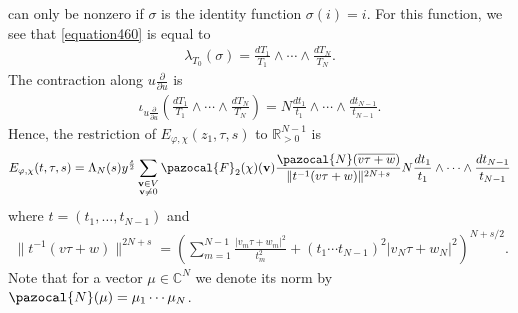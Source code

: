 \documentclass[a4paper,11pt]{amsart} %
\newcommand{\8}{\infty}
\newcommand{\vbf}{\mathbf{v}}
\newcommand{\four}{\pazocal{F}}
\newcommand{\R}{\mathbb{R}}
\newcommand{\C}{\mathbb{C}}
\newcommand{\N}{\pazocal{N}}
\theoremstyle{mytheoremstyle}
\theoremstyle{remark}
\numberwithin{equation}{section}
\begin{document}
can only be nonzero if $\sigma$ is the identity function $\sigma(i)=i$. For this function, we see that \eqref{equation460} is equal to
\begin{align}
\lambda_{T_0}(\sigma)=\frac{dT_1}{T_1} \wedge \cdots \wedge \frac{dT_N}{T_N}.
\end{align}
The contraction along $u \frac{\partial}{\partial u}$ is 
\begin{align}
\iota_{u \frac{\partial}{\partial u}} \left (\frac{dT_1}{T_1} \wedge \cdots \wedge \frac{dT_N}{T_N} \right )=N \frac{dt_1}{t_1} \wedge \cdots \wedge \frac{dt_{N-1}}{t_{N-1}}.
\end{align}
Hence, the restriction of $E_{\varphi, \chi}(z_1,\tau,s)$ to $\R_{>0}^{N-1}$ is
\begin{align}
E_{\varphi, \chi}(t,\tau,s)= \Lambda_N(s) y^{\frac{s}{2}} \sum_{\substack{\vbf \in  V \\ \vbf \neq 0}} \four_2(\chi)(\vbf)  \frac{\N(\overline{v\tau+w})}{ \lVert t^{-1} (v\tau+w) \rVert^{2N+s}} N\frac{dt_1}{t_1} \wedge \cdots \wedge \frac{dt_{N-1}}{t_{N-1}}
\end{align}
where $t=(t_1,\dots,t_{N-1})$ and
\begin{align}
\lVert t^{-1} (v\tau+w) \rVert^{2N+s}= \left ( \sum_{m=1}^{N-1}\frac{\vert v_m\tau+w_m\vert^2}{t_m^2}+ (t_1\cdots t_{N-1})^2\vert v_N\tau+w_N\vert^2\right )^{N+s/2}.
\end{align}
Note that for a vector $\mu \in \C^N$ we denote its norm by $\N(\mu)=\mu_1 \cdots \mu_N$. 
\end{document}
